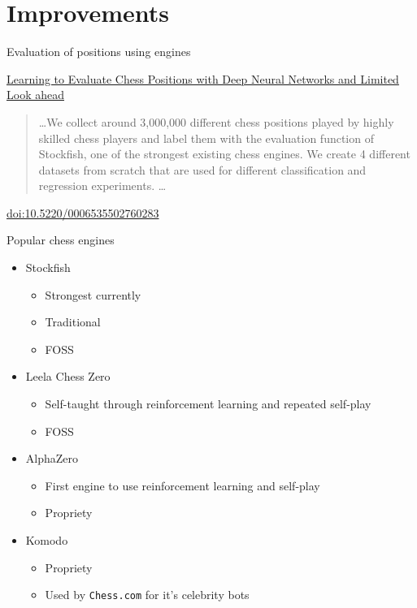 \documentclass[presentation, 8pt]{beamer}
\begin{document}
\section{Improvements}
\label{sec:orgce9dad3}
\begin{frame}[label={sec:org1b2dd5b}]{Evaluation of positions using engines}
\begin{block}{\href{https://www.scitepress.org/papers/2018/65355/65355.pdf}{Learning to Evaluate Chess Positions with Deep Neural Networks and Limited Look ahead}}
\begin{quote}
\ldots{}We collect around 3,000,000 different chess positions played by highly skilled chess players and label them with the evaluation function of Stockfish, one of the strongest existing chess engines. We create 4 different datasets from scratch that are used for different classification and regression experiments. \ldots{}
\end{quote}
\href{https://doi.org/10.5220/0006535502760283}{doi:10.5220/0006535502760283}
\end{block}
\end{frame}
\begin{frame}[label={sec:orgf4bc73b},fragile]{Popular chess engines}
 \begin{itemize}
\item Stockfish
\begin{itemize}
\item Strongest currently
\item Traditional
\item FOSS
\end{itemize}
\item Leela Chess Zero
\begin{itemize}
\item Self-taught through reinforcement learning and repeated self-play
\item FOSS
\end{itemize}
\item AlphaZero
\begin{itemize}
\item First engine to use reinforcement learning and self-play
\item Propriety
\end{itemize}
\item Komodo
\begin{itemize}
\item Propriety
\item Used by \texttt{Chess.com} for it's celebrity bots
\end{itemize}
\end{itemize}
\end{frame}
\end{document}
